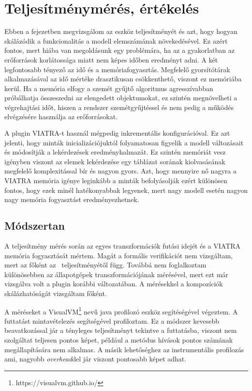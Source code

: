 \chapter{Teljesítménymérés, értékelés}

Ebben a fejezetben megvizsgálom az eszköz teljesítményét és azt, hogy hogyan skálázódik a funkcionalitás a modell elemszámának növekedésével. Ez azért fontos, mert  hiába van megoldásunk egy problémára, ha az a gyakorlatban az erőforrások korlátossága miatt nem képes időben eredményt adni. A két legfontosabb tényező az idő és a memóriafogyasztás. Megfelelő gyorsítótárak alkalmazásával az idő mértéke drasztikusan csökkenthető, viszont ez memóriába kerül. Ha a memória elfogy a szemét gyűjtő algoritmus agresszívabban próbálhatja összeszedni az elengedett objektumokat, ez szintén megnövelheti a végrehajtási időt, hiszen a rendszer szemétgyűjtéssel és nem pedig a működés elvégzésére használja az erőforrásokat.

A plugin VIATRA-t használ mégpedig inkrementális konfigurációval. Ez azt jelenti, hogy minták inicializációjuktól folyamatosan figyelik a modell változásait és módosítják a lekérdezések eredményhalmazát. Ez szintén memóriát vesz igényben viszont az elemek lekérdezése egy táblázat sorának kiolvasásának megfelelő komplexitással bír és nagyon gyors. Azt, hogy mennyire nő nagyra a VIATRA memória igénye leginkább a minták befolyásolják ezért különösen fontos, hogy ezek minél hatékonyabbak legyenek, mert nagy modell esetén nagyon nagy memória fogyasztást eredményezhetnek.

\section{Módszertan}

A teljesítmény mérés során az egyes transzformációk futási idejét és a VIATRA memória fogyasztását mértem. Magát a formális verifikációt  nem vizsgáltam, mert az főként az \uppaal\ teljesítményétől függ. Továbbá nem foglalkoztam különösebben az állapotgépek transzformációjának mérésével, mert ezt már vizsgálva volt a plugin korábbi változatában. A mérésekkel a kompozíciók skálázhatóságát vizsgáltam főként.

A méréseket a VisualVM\footnote{https://visualvm.github.io/} nevű java profilozó eszköz segítéségével végeztem. A futtatást mintavételezés segítségével profiloztam. Ez a módszer kevesebb beavatkozással jár a tényleges teljesítményt tekintve a futtatásba, viszont nem szolgáltat teljesen pontos képet, például a metódus hívások pontos számának megállapítására nem alkalmas. A másik lehetőséghez az instrumentális profilozás ami, nagyobb \emph{overhead}del jár viszont pontosabb képet adhat.

